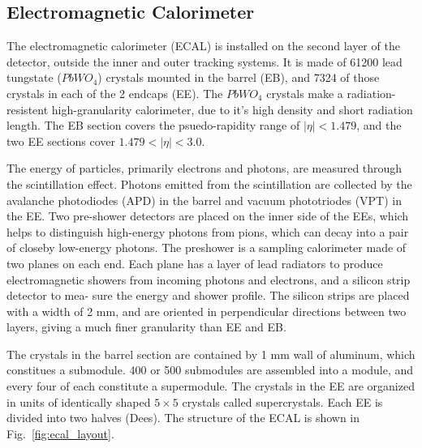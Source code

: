 \subsection{Electromagnetic Calorimeter}

The electromagnetic calorimeter (ECAL) is installed on the second layer of the detector, outside the inner and outer tracking systems. It is made of
61200 lead tungstate ($PbWO_{4}$) crystals mounted in the barrel (EB), and 7324 of those crystals in each of the 2 endcaps (EE). The $PbWO_{4}$ crystals make
a radiation-resistent high-granularity calorimeter, due to it's high density and short radiation length. The EB section covers the psuedo-rapidity range
of $|\eta| < 1.479$, and the two EE sections cover $1.479 < |\eta| < 3.0$.

The energy of particles, primarily electrons and photons, are measured through the scintillation effect. Photons emitted from the scintillation are 
collected by the avalanche photodiodes (APD) in the barrel and vacuum phototriodes (VPT) in the EE. Two pre-shower detectors are placed on the inner side
of the EEs, which helps to distinguish high-energy photons from pions, which can decay into a pair of closeby low-energy photons. The preshower is a sampling 
calorimeter made of two planes on each end. Each plane has a layer of lead radiators to produce electromagnetic showers from incoming photons and electrons, 
and a silicon strip detector to mea- sure the energy and shower profile. The silicon strips are placed with a width of 2 mm, and are oriented in perpendicular 
directions between two layers, giving a much finer granularity than EE and EB. 

The crystals in the barrel section are contained by 1 mm wall of aluminum, which constitues a submodule. 400 or 500 submodules are assembled into a module, 
and every four of each constitute a supermodule. The crystals in the EE are organized in units of identically shaped $5 \times 5$ crystals called supercrystals. 
Each EE is divided into two halves (Dees). The structure of the ECAL is shown in Fig.~\ref{fig:ecal_layout}.

